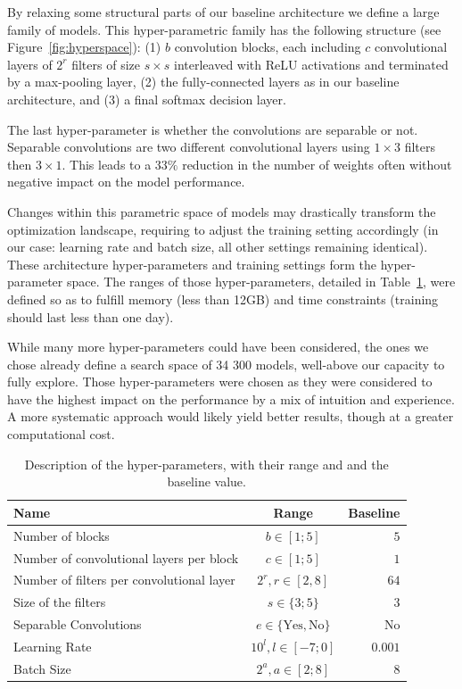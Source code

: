 By relaxing some structural parts of our baseline architecture we define a large family of models. This hyper-parametric family has the following structure (see Figure~\ref{fig:hyperspace}): (1) $b$ convolution blocks, each including $c$ convolutional layers of $2^r$ filters of size $s \times s$ interleaved with ReLU activations and terminated by a max-pooling layer, (2) the fully-connected layers as in our baseline architecture, and (3) a final softmax decision layer. 

The last hyper-parameter is whether the convolutions are separable or not. Separable convolutions are two different convolutional layers using $1 \times 3$ filters then $3 \times 1$. This leads to a $33 \%$ reduction in the number of weights often without negative impact on the model performance.

Changes within this parametric space of models may drastically transform the optimization landscape, requiring to adjust the training setting accordingly (in our case: learning rate and batch size, all other settings remaining identical). 
These architecture hyper-parameters and training settings form the hyper-parameter space. The ranges of those hyper-parameters, detailed in Table~\ref{table:hyper}, were defined so as to fulfill memory (less than 12GB) and time constraints (training should last less than one day).

While many more hyper-parameters could have been considered, the ones we chose already define a search space of 34 300 models, well-above our capacity to fully explore. Those hyper-parameters were chosen as they were considered to have the highest impact on the performance by a mix of intuition and experience. A more systematic approach would likely yield better results, though at a greater computational cost.

\begin{table}
	\centering
	\begin{tabular}{ | l | c | r | }
		\hline
		Name & Range & Baseline \\ \hline
		Number of blocks & $b \in [1 ; 5]$ & $5$ \\
		Number of convolutional layers per block & $c \in [1 ; 5]$ & $1$ \\
		Number of filters per convolutional layer & $2^{r}, r \in [2, 8]$ & $64$ \\
		Size of the filters & $ s \in \{3 ; 5\}$ & $3$ \\
		Separable Convolutions & $e \in \{\text{Yes}, \text{No}\}$ & No \\
		Learning Rate & $10^{l}, l \in [-7 ; 0]$ & $0.001$ \\
		Batch Size & $2^{a}, a \in [2 ; 8]$ & 8 \\
		\hline
	\end{tabular}
	\caption{Description of the hyper-parameters, with their range and and the baseline value.}
	\label{table:hyper}
\end{table}

